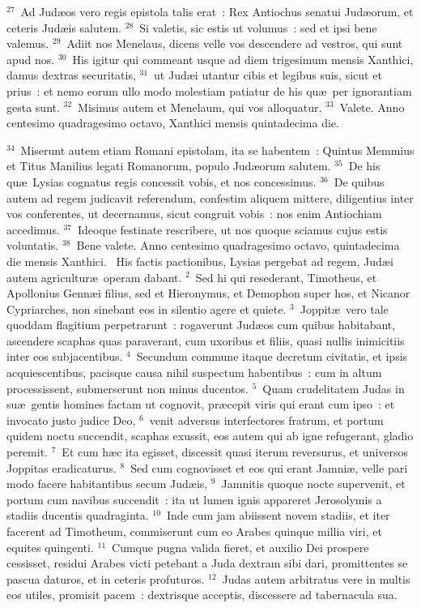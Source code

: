 ${}^{27}$~Ad Jud\ae os vero regis epistola talis erat~: Rex Antiochus senatui Jud\ae orum, et ceteris Jud\ae is salutem.
${}^{28}$~Si valetis, sic estis ut volumus~: sed et ipsi bene valemus.
${}^{29}$~Adiit nos Menelaus, dicens velle vos descendere ad vestros, qui sunt apud nos.
${}^{30}$~His igitur qui commeant usque ad diem trigesimum mensis Xanthici, damus dextras securitatis,
${}^{31}$~ut Jud\ae i utantur cibis et legibus suis, sicut et prius~: et nemo eorum ullo modo molestiam patiatur de his qu\ae\ per ignorantiam gesta sunt.
${}^{32}$~Misimus autem et Menelaum, qui vos alloquatur.
${}^{33}$~Valete. Anno centesimo quadragesimo octavo, Xanthici mensis quintadecima die.


${}^{34}$~Miserunt autem etiam Romani epistolam, ita se habentem~: Quintus Memmius et Titus Manilius legati Romanorum, populo Jud\ae orum salutem.
${}^{35}$~De his qu\ae\ Lysias cognatus regis concessit vobis, et nos concessimus.
${}^{36}$~De quibus autem ad regem judicavit referendum, confestim aliquem mittere, diligentius inter vos conferentes, ut decernamus, sicut congruit vobis~: nos enim Antiochiam accedimus.
${}^{37}$~Ideoque festinate rescribere, ut nos quoque sciamus cujus estis voluntatis.
${}^{38}$~Bene valete. Anno centesimo quadragesimo octavo, quintadecima die mensis Xanthici.
~\lettrine[lines=10,image=true,loversize=0.05,lraise=-0.03]{H}{}is factis pactionibus, Lysias pergebat ad regem, Jud\ae i autem agricultur\ae\ operam dabant.
${}^{2}$~Sed hi qui resederant, Timotheus, et Apollonius Genn\ae i filius, sed et Hieronymus, et Demophon super hos, et Nicanor Cypriarches, non sinebant eos in silentio agere et quiete.
${}^{3}$~Joppit\ae\ vero tale quoddam flagitium perpetrarunt~: rogaverunt Jud\ae os cum quibus habitabant, ascendere scaphas quas paraverant, cum uxoribus et filiis, quasi nullis inimicitiis inter eos subjacentibus.
${}^{4}$~Secundum commune itaque decretum civitatis, et ipsis acquiescentibus, pacisque causa nihil suspectum habentibus~: cum in altum processissent, submerserunt non minus ducentos.
${}^{5}$~Quam crudelitatem Judas in su\ae\ gentis homines factam ut cognovit, pr\ae cepit viris qui erant cum ipso~: et invocato justo judice Deo,
${}^{6}$~venit adversus interfectores fratrum, et portum quidem noctu succendit, scaphas exussit, eos autem qui ab igne refugerant, gladio peremit.
${}^{7}$~Et cum h\ae c ita egisset, discessit quasi iterum reversurus, et universos Joppitas eradicaturus.
${}^{8}$~Sed cum cognovisset et eos qui erant Jamni\ae , velle pari modo facere habitantibus secum Jud\ae is,
${}^{9}$~Jamnitis quoque nocte supervenit, et portum cum navibus succendit~: ita ut lumen ignis appareret Jerosolymis a stadiis ducentis quadraginta.
${}^{10}$~Inde cum jam abiissent novem stadiis, et iter facerent ad Timotheum, commiserunt cum eo Arabes quinque millia viri, et equites quingenti.
${}^{11}$~Cumque pugna valida fieret, et auxilio Dei prospere cessisset, residui Arabes victi petebant a Juda dextram sibi dari, promittentes se pascua daturos, et in ceteris profuturos.
${}^{12}$~Judas autem arbitratus vere in multis eos utiles, promisit pacem~: dextrisque acceptis, discessere ad tabernacula sua.


